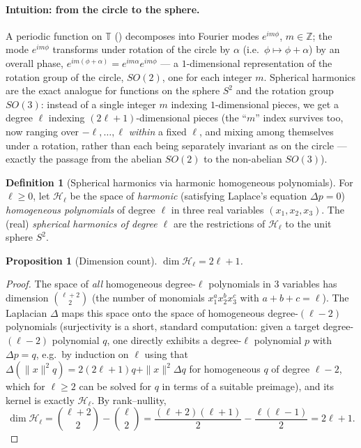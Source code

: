 \documentclass[11pt,a4paper]{report}
\newtheorem{proposition}[proposition]{Proposition}
\theoremstyle{definition}
\newtheorem{definition}[definition]{Definition}
\theoremstyle{remark}
\newcommand{\ZZ}{\mathbb Z}
\begin{document}
\paragraph{Intuition: from the circle to the sphere.} A periodic function
on $\mathbb T$ () decomposes into Fourier modes
$e^{im\phi}$, $m\in\ZZ$; the mode $e^{im\phi}$ transforms under rotation of
the circle by $\alpha$ (i.e.\ $\phi\mapsto\phi+\alpha$) by an overall phase,
$e^{im(\phi+\alpha)}=e^{im\alpha}e^{im\phi}$ --- a $1$-dimensional
representation of the rotation group of the circle, $SO(2)$, one for each
integer $m$. Spherical harmonics are the exact analogue for functions on
the sphere $S^2$ and the rotation group $SO(3)$: instead of a single integer
$m$ indexing $1$-dimensional pieces, we get a degree $\ell$ indexing
$(2\ell+1)$-dimensional pieces (the ``$m$'' index survives too, now ranging
over $-\ell,\dots,\ell$ \emph{within} a fixed $\ell$, and mixing among
themselves under a rotation, rather than each being separately invariant as
on the circle --- exactly the passage from the abelian $SO(2)$ to the
non-abelian $SO(3)$).

\begin{definition}[Spherical harmonics via harmonic homogeneous polynomials]
\label{def:sph-harm-def}
For $\ell\ge0$, let $\mathcal H_\ell$ be the space of \emph{harmonic}
(satisfying Laplace's equation $\Delta p=0$) \emph{homogeneous polynomials}
of degree $\ell$ in three real variables $(x_1,x_2,x_3)$. The (real)
\emph{spherical harmonics of degree $\ell$} are the restrictions of
$\mathcal H_\ell$ to the unit sphere $S^2$.
\end{definition}

\begin{proposition}[Dimension count]
\label{prop:sph-dim}
$\dim\mathcal H_\ell = 2\ell+1$.
\end{proposition}

\begin{proof}
The space of \emph{all} homogeneous degree-$\ell$ polynomials in $3$
variables has dimension $\binom{\ell+2}{2}$ (the number of monomials
$x_1^{a}x_2^{b}x_3^{c}$ with $a+b+c=\ell$). The Laplacian $\Delta$ maps this
space onto the space of homogeneous degree-$(\ell-2)$ polynomials
(surjectivity is a short, standard computation: given a target
degree-$(\ell-2)$ polynomial $q$, one directly exhibits a degree-$\ell$
polynomial $p$ with $\Delta p=q$, e.g.\ by induction on $\ell$ using that
$\Delta(\|x\|^2q)=2(2\ell+1)q+\|x\|^2\Delta q$ for homogeneous $q$ of degree
$\ell-2$, which for $\ell\ge2$ can be solved for $q$ in terms of a suitable
preimage), and its kernel is exactly $\mathcal H_\ell$. By rank--nullity,
\[
\dim\mathcal H_\ell
=
\binom{\ell+2}{2} - \binom{\ell}{2}
=
\frac{(\ell+2)(\ell+1)}2 - \frac{\ell(\ell-1)}2
=
2\ell+1 .
\]
\end{proof}
\end{document}
